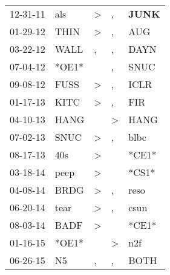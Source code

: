 \begin{supertabular}{p{0.07\textwidth}p{0.06\textwidth}p{0.02\textwidth}p{0.02\textwidth}p{0.06\textwidth}}
 12-31-11\textsuperscript{} &   als\textsuperscript{} &  \textgreater &             , &  \textbf{JUNK\textsuperscript{}} \\
 01-29-12\textsuperscript{} &  THIN\textsuperscript{} &  \textgreater &             , &            AUG\textsuperscript{} \\
 03-22-12\textsuperscript{} &  WALL\textsuperscript{} &             , &             , &           DAYN\textsuperscript{} \\
 07-04-12\textsuperscript{} &                   *OE1* &               &             , &           SNUC\textsuperscript{} \\
 09-08-12\textsuperscript{} &  FUSS\textsuperscript{} &  \textgreater &             , &           ICLR\textsuperscript{} \\
 01-17-13\textsuperscript{} &  KITC\textsuperscript{} &  \textgreater &             , &            FIR\textsuperscript{} \\
 04-10-13\textsuperscript{} &  HANG\textsuperscript{} &               &  \textgreater &           HANG\textsuperscript{} \\
 07-02-13\textsuperscript{} &  SNUC\textsuperscript{} &  \textgreater &             , &           blbc\textsuperscript{} \\
 08-17-13\textsuperscript{} &   40s\textsuperscript{} &  \textgreater &               &                            *CE1* \\
 03-18-14\textsuperscript{} &  peep\textsuperscript{} &  \textgreater &               &                            *CS1* \\
 04-08-14\textsuperscript{} &  BRDG\textsuperscript{} &  \textgreater &             , &           reso\textsuperscript{} \\
 06-20-14\textsuperscript{} &  tear\textsuperscript{} &  \textgreater &             , &           csun\textsuperscript{} \\
 08-03-14\textsuperscript{} &  BADF\textsuperscript{} &  \textgreater &               &                            *CE1* \\
 01-16-15\textsuperscript{} &                   *OE1* &               &  \textgreater &            n2f\textsuperscript{} \\
 06-26-15\textsuperscript{} &    N5\textsuperscript{} &             , &             , &           BOTH\textsuperscript{} \\

\end{supertabular}
